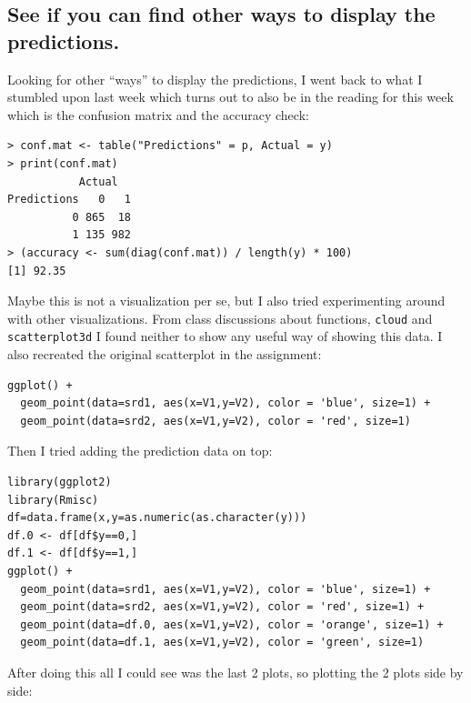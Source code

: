 \documentclass[10pt]{article}
\begin{document}
\subsection*{See if you can find other ways to display the predictions.} 
Looking for other “ways” to display the predictions, I went back to what I stumbled upon last week which turns out to also be in the reading for this week which is the confusion matrix and the accuracy check:\pagebreak 
\begin{verbatim}
> conf.mat <- table("Predictions" = p, Actual = y) 
> print(conf.mat) 
           Actual 
Predictions   0   1 
          0 865  18 
          1 135 982 
> (accuracy <- sum(diag(conf.mat)) / length(y) * 100) 
[1] 92.35 
\end{verbatim}
Maybe this is not a visualization per se, but I also tried experimenting around with other visualizations. From class discussions about functions, \verb|cloud| and \verb|scatterplot3d| I found neither to show any useful way of showing this data. I also recreated the original scatterplot in the assignment: 
\begin{verbatim}
ggplot() +  
  geom_point(data=srd1, aes(x=V1,y=V2), color = 'blue', size=1) +  
  geom_point(data=srd2, aes(x=V1,y=V2), color = 'red', size=1) 
\end{verbatim}
Then I tried adding the prediction data on top: 
\begin{verbatim}
library(ggplot2) 
library(Rmisc) 
df=data.frame(x,y=as.numeric(as.character(y))) 
df.0 <- df[df$y==0,] 
df.1 <- df[df$y==1,] 
ggplot() +  
  geom_point(data=srd1, aes(x=V1,y=V2), color = 'blue', size=1) +  
  geom_point(data=srd2, aes(x=V1,y=V2), color = 'red', size=1) + 
  geom_point(data=df.0, aes(x=V1,y=V2), color = 'orange', size=1) +  
  geom_point(data=df.1, aes(x=V1,y=V2), color = 'green', size=1) 
\end{verbatim}
After doing this all I could see was the last 2 plots, so plotting the 2 plots side by side: 
\end{document}
